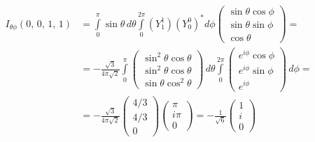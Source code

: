 \begin{align*}
    I_{\theta\phi}(0,\,0,\,1,\,1) &= \int\limits_{0}^{\pi}\sin\theta\,d\theta\int\limits_{0}^{2\pi}(Y^1_1)(Y^0_0)^* d\phi \begin{pmatrix} \sin\theta\cos\phi \\ \sin\theta\sin\phi \\ \cos\theta \end{pmatrix} = \\
    & = -\frac{\sqrt{3}}{4\pi\sqrt{2}}\int\limits_{0}^{\pi} \begin{pmatrix} \sin^2 \theta\cos\theta \\ \sin^2 \theta\cos\theta \\ \sin\theta\cos^2\theta \end{pmatrix} \, d\theta \int\limits_{0}^{2\pi} \begin{pmatrix} e^{i\phi}\cos\phi \\ e^{i\phi}\sin\phi \\ e^{i\phi} \end{pmatrix} \, d\phi = \\
    & = -\frac{\sqrt{3}}{4\pi\sqrt{2}}\begin{pmatrix} 4/3 \\  4/3 \\ 0 \end{pmatrix} \begin{pmatrix} \pi \\ i\pi \\ 0 \end{pmatrix} = -\frac{1}{\sqrt{6}}\begin{pmatrix} 1 \\  i \\ 0 \end{pmatrix}
\end{align*}
